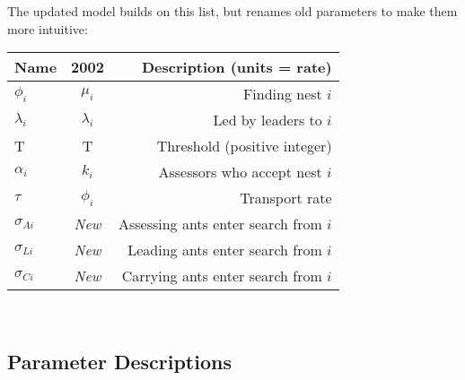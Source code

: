 \documentclass{article}
\begin{document}
The updated model builds on this list, but renames old parameters to make them more intuitive: \\

\begin{tabular}{ l | c | r }
    \hline
  Name          & 2002        & Description (units = rate)\\ \hline
  $\phi_i$      & $\mu_i$     & Finding nest $i$\\
  $\lambda_i$   & $\lambda_i$ & Led by leaders to $i$\\
  T             & T           & Threshold (positive integer)\\
  $\alpha_i$    & $k_i$       & Assessors who accept nest $i$\\ \hline
  $\tau$        & $\phi_i$    & Transport rate \\
  $\sigma_{Ai}$ & \em{New}    & Assessing ants enter search from $i$\\
  $\sigma_{Li}$ & \em{New}    & Leading ants enter search from $i$\\
  $\sigma_{Ci}$ & \em{New}    & Carrying ants enter search from $i$\\
  \hline
\end{tabular} \\

\subsection{Parameter Descriptions} 
\end{document}

